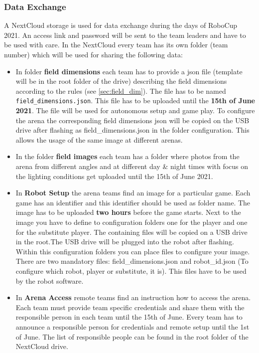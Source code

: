 \subsubsection{Data Exchange}
A NextCloud storage is used for data exchange during the days of RoboCup 2021. An access link and password will be sent to the team leaders and have to be used with care. In the NextCloud every team has its own folder (team number) which will be used for sharing the following data:

\begin{itemize}
    \item In folder \textbf{field dimensions} each team has to provide a json file (template will be in the root folder of the drive) describing the field dimensions according to the rules (see \ref{sec:field_dim}). The file has to be named \texttt{field\_dimensions.json}. This file has to be uploaded until the \textbf{15th of June 2021}. The file will be used for autonomous setup and game play. To configure the arena the corresponding field dimensions json will be copied on the USB drive after flashing as field\_dimensions.json in the folder configuration. This allows the usage of the same image at different arenas.
    \item  In the folder \textbf{field images} each team has a folder where photos from the arena from different angles and at different day \& night times with focus on the lighting conditions get uploaded until the 15th of June 2021.
    \item In \textbf{Robot Setup} the arena teams find an image for a particular game. Each game has an identifier and this identifier should be used as folder name. The image has to be uploaded \textbf{two hours} before the game starts. Next to the image you have to define to configuration folders one for the player and one for the substitute player. The containing files will be copied on a USB drive in the root.The USB drive will be plugged into the robot after flashing. Within this configuration folders you can place files to configure your image. There are two mandatory files: field\_dimensions.json and robot\_id.json (To configure which robot, player or substitute, it is). This files have to be used by the robot software.
    \item In \textbf{Arena Access} remote teams find an instruction how to access the arena. Each team must provide team specific credentials and share them with the responsible person in each team until the 15th of June. Every team has to announce a responsible person for credentials and remote setup until the 1st of June. The list of responsible people can be found in the root folder of the NextCloud drive.

\end{itemize}
